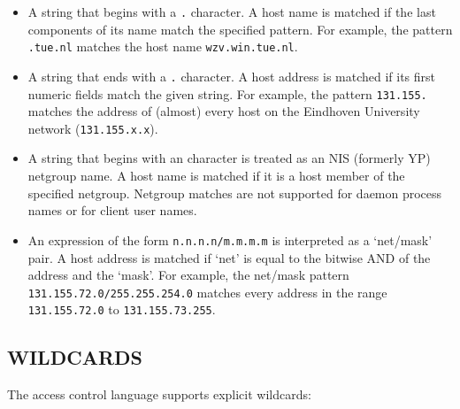 \documentclass[11pt,twoside,a4paper]{book}
\newcommand{\dsc}{\discretionary{}{}{}}
\begin{document}
\begin{itemize}

\item A string that begins with a \texttt{.} character. A host name is
matched if the last components of its name match the specified
pattern.  For example, the pattern \texttt{.tue.nl} matches the host
name \texttt{wzv.win.tue.nl}.

\item A string that ends with a \texttt{.} character. A host address
is matched if its first numeric fields match the given string.  For
example, the pattern \texttt{131.155.} matches the address of (almost)
every host on the Eindhoven University network (\texttt{131.155.x.x}).

\item A string that begins with an \texttt{\@} character is treated as
an NIS (formerly YP) netgroup name. A host name is matched if it is a
host member of the specified netgroup. Netgroup matches are not
supported for daemon process names or for client user names.

\item An expression of the form \texttt{n.n.n.n/m.m.m.m} is
interpreted as a `net/mask' pair. A host address is matched if `net'
is equal to the bitwise AND of the address and the `mask'. For
example, the net/mask pattern
\texttt{131.155.72.0/\dsc{}255.255.254.0} matches every address in the
range \texttt{131.155.72.0} to \texttt{131.155.73.255}.

\end{itemize}

\subsection*{WILDCARDS}

The access control language supports explicit wildcards:
\end{document}
